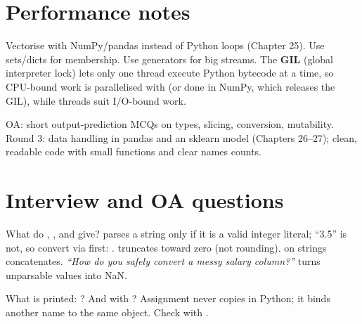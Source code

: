 \section{Performance notes}
Vectorise with NumPy/pandas instead of Python loops (Chapter 25). Use sets/dicts for membership. Use generators for big streams. The \textbf{GIL} (global interpreter
lock) lets only one thread execute Python bytecode at a time, so CPU-bound work is parallelised with  (or done in NumPy, which releases the
GIL), while threads suit I/O-bound work.

\begin{practical}
OA: short output-prediction MCQs on types, slicing, conversion, mutability. Round 3: data handling in pandas and an sklearn model (Chapters 26--27); clean,
readable code with small functions and clear names counts.
\end{practical}

\section{Interview and OA questions}

\begin{qa}{ What do , ,  and  give?}
\why {} parses a string only if it is a valid integer literal; ``3.5'' is not, so convert via  first: .
 truncates toward zero (not rounding). \code{+} on strings concatenates.
\pushes \emph{``How do you safely convert a messy salary column?''}  turns unparsable values into NaN.
\end{qa}

\begin{qa}{What is printed: ? And with ?}
\why Assignment never copies in Python; it binds another name to the same object. Check with .
\end{qa}

